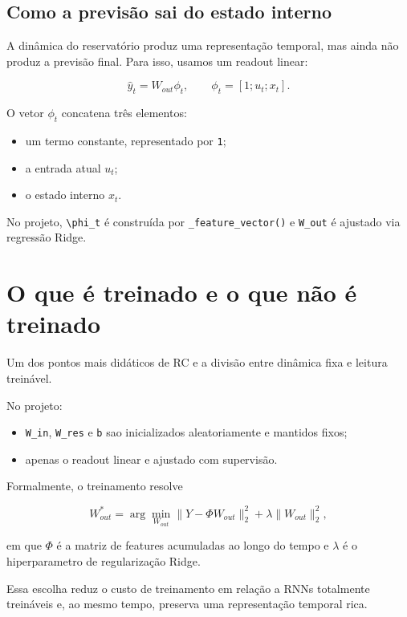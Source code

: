\documentclass[12pt]{article}
\providecommand{\tightlist}{%
              \setlength{\itemsep}{0pt}\setlength{\parskip}{0pt}}
\begin{document}
\subsection{Como a previsão sai do estado interno}\label{36-como-a-previsuxe3o-sai-do-estado-interno}

A dinâmica do reservatório produz uma representação temporal, mas ainda não produz a previsão final. Para isso, usamos um readout linear:

\[
\hat{y}_t = W_{out} \phi_t,
\qquad
\phi_t = [1; u_t; x_t].
\]

O vetor \(\phi_t\) concatena três elementos:

\begin{itemize}
\tightlist
\item
  um termo constante, representado por \texttt{1};
\item
  a entrada atual \(u_t\);
\item
  o estado interno \(x_t\).
\end{itemize}

No projeto, \texttt{\textbackslash{}phi\_t} é construída por \texttt{\_feature\_vector()} e \texttt{W\_out} é ajustado via regressão Ridge.

\section{O que é treinado e o que não é treinado}\label{4-o-que-uxe9-treinado-e-o-que-nuxe3o-uxe9-treinado}

Um dos pontos mais didáticos de RC e a divisão entre dinâmica fixa e leitura treinável.

No projeto:

\begin{itemize}
\tightlist
\item
  \texttt{W\_in}, \texttt{W\_res} e \texttt{b} sao inicializados aleatoriamente e mantidos fixos;
\item
  apenas o readout linear e ajustado com supervisão.
\end{itemize}

Formalmente, o treinamento resolve

\[
W_{out}^* = \arg\min_{W_{out}}
\|Y - \Phi W_{out}\|_2^2 + \lambda \|W_{out}\|_2^2,
\]

em que \(\Phi\) é a matriz de features acumuladas ao longo do tempo e \(\lambda\) é o hiperparametro de regularização Ridge.

Essa escolha reduz o custo de treinamento em relação a RNNs totalmente treináveis e, ao mesmo tempo, preserva uma representação temporal rica.
\end{document}
